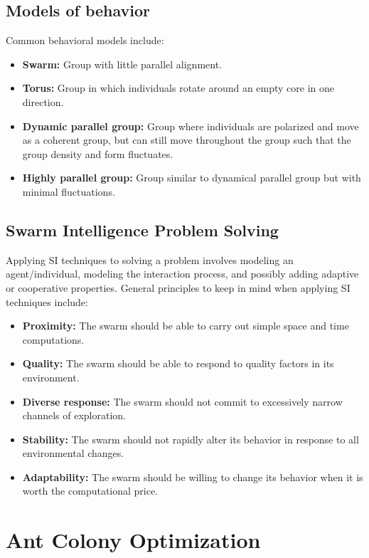 \documentclass[12pt,titlepage]{article}
\let\stdsection\section
\renewcommand\section{\clearpage\stdsection}
\begin{document}
    \subsection{Models of behavior}
      Common behavioral models include:
      \begin{itemize}
        \item \textbf{Swarm:} Group with little parallel alignment.
        \item \textbf{Torus:} Group in which individuals rotate around an empty core in one direction.
        \item \textbf{Dynamic parallel group:} Group where individuals are polarized and move as a coherent group, but can still move throughout the group
          such that the group density and form fluctuates.
        \item \textbf{Highly parallel group:} Group similar to dynamical parallel group but with minimal fluctuations.
      \end{itemize}

    \subsection{Swarm Intelligence Problem Solving}
      Applying SI techniques to solving a problem involves modeling an agent/individual, modeling the interaction process, and possibly adding
      adaptive or cooperative properties. General principles to keep in mind when applying SI techniques include:
      \begin{itemize}
        \item \textbf{Proximity:} The swarm should be able to carry out simple space and time computations.
        \item \textbf{Quality:} The swarm should be able to respond to quality factors in its environment.
        \item \textbf{Diverse response:} The swarm should not commit to excessively narrow channels of exploration.
        \item \textbf{Stability:} The swarm should not rapidly alter its behavior in response to all environmental changes.
        \item \textbf{Adaptability:} The swarm should be willing to change its behavior when it is worth the computational price.
      \end{itemize}

  \section{Ant Colony Optimization}
\end{document}

